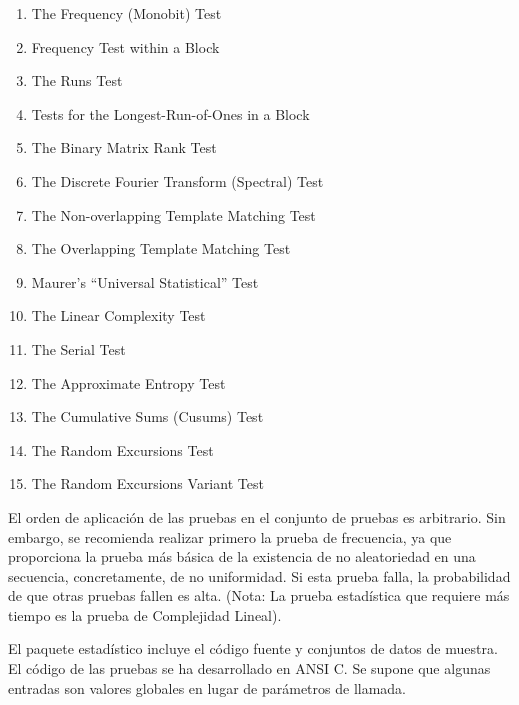 	\begin{enumerate}[noitemsep]
		\item The Frequency (Monobit) Test
		\item Frequency Test within a Block
		\item The Runs Test
		\item Tests for the Longest-Run-of-Ones in a Block
		\item The Binary Matrix Rank Test
		\item The Discrete Fourier Transform (Spectral) Test
		\item The Non-overlapping Template Matching Test
		\item The Overlapping Template Matching Test
		\item Maurer's ``Universal Statistical'' Test
		\item The Linear Complexity Test
		\item The Serial Test
		\item The Approximate Entropy Test
		\item The Cumulative Sums (Cusums) Test
		\item The Random Excursions Test
		\item The Random Excursions Variant Test				\end{enumerate}

El orden de aplicación de las pruebas en el conjunto de pruebas es arbitrario. Sin embargo, se recomienda realizar primero la prueba de frecuencia, ya que proporciona la prueba más básica de la existencia de no aleatoriedad en una secuencia, concretamente, de no uniformidad. Si esta prueba falla, la probabilidad de que otras pruebas fallen es alta. (Nota: La prueba estadística que requiere más tiempo es la prueba de Complejidad Lineal).

El paquete estadístico incluye el código fuente y conjuntos de datos de muestra. El código de las pruebas se ha desarrollado en ANSI C. Se supone que algunas entradas son valores globales en lugar de parámetros de llamada.


